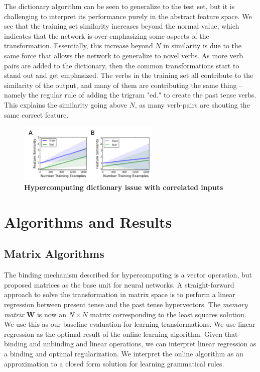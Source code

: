 \documentclass{article}
\begin{document}
The dictionary algorithm can be seen to generalize to the test set, but it is challenging to interpret its performance purely in the abstract feature space. We see that the training set similarity increases beyond the normal value, which indicates that the network is over-emphasizing some aspects of the transformation. Essentially, this increase beyond $N$ in similarity is due to the same force that allows the network to generalize to novel verbs. As more verb pairs are added to the dictionary, then the common transformations start to stand out and get emphasized. The verbs in the training set all contribute to the similarity of the output, and many of them are contributing the same thing -- namely the regular rule of adding the trigram "ed." to create the past tense verbs. This explains the similarity going above $N$, as many verb-pairs are shouting the same correct feature. 

\begin{figure}
\centering
\includegraphics[width=0.6\textwidth]{dictionary_issue-170518.png}
\caption{\textbf{Hypercomputing dictionary issue with correlated inputs}}
\end{figure}

\section{Algorithms and Results}

\subsection{Matrix Algorithms}

The binding mechanism described for hypercomputing is a vector operation, but \citet{Rumelhart1986a} proposed matrices as the base unit for neural networks. A straight-forward approach to solve the transformation in matrix space is to perform a linear regression between present tense and the past tense hypervectors. The \emph{memory matrix} $\mathbf{W}$ is now an $N \times N$ matrix corresponding to the least squares solution. We use this as our baseline evaluation for learning transformations. We use linear regression as the optimal result of the online learning algorithm. Given that binding and unbinding and linear operations, we can interpret linear regression as a binding and optimal regularization. We interpret the online algorithm as an approximation to a closed form solution for learning grammatical rules. 
\end{document}
